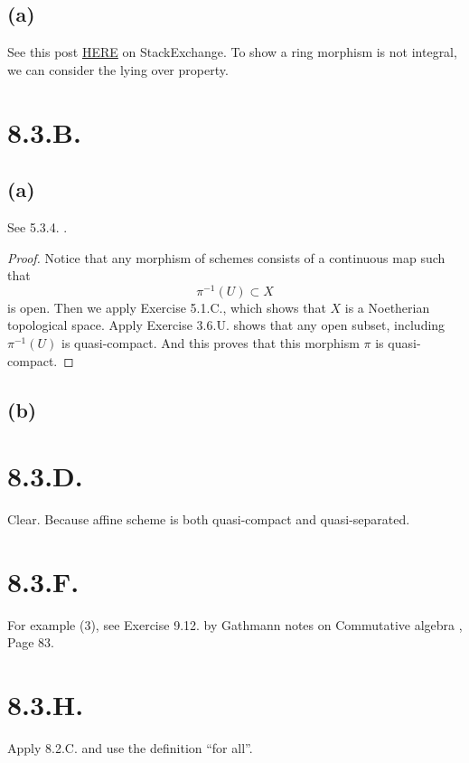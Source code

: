 \subsection{(a)}
See this post \href{https://math.stackexchange.com/questions/3137459/kx-x-is-not-integral-over-kx}{HERE} on StackExchange.
To show a ring morphism is not integral, we can consider the lying over property. 

\section{8.3.B.}

\subsection{(a)}
	See 5.3.4. \cite{RaviRisingSea}.
\begin{proof}
	Notice that any morphism of schemes consists of a continuous map such that 
	\[\pi^{-1}(U)\subset X\]
	is open. Then we apply Exercise 5.1.C., which shows that $X$ is a Noetherian topological space. Apply Exercise 3.6.U. shows that any open subset, including $\pi^{-1}(U)$ is quasi-compact. And this proves that this morphism $\pi$ is quasi-compact.
\end{proof}

\subsection{(b)}


\section{8.3.D.}

Clear. Because affine scheme is both quasi-compact and quasi-separated.

\section{8.3.F.}

For example (3), see Exercise 9.12. by Gathmann notes on Commutative algebra \cite{GathNotes}, Page 83.

\section{8.3.H.}

Apply 8.2.C. and use the definition \enquote{for all}.